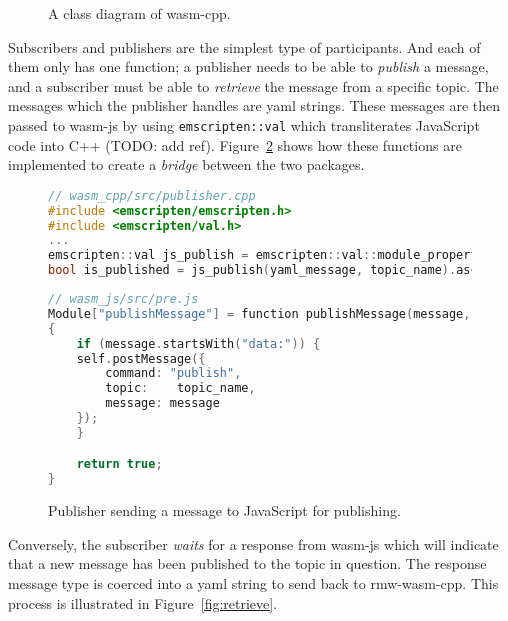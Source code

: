 \begin{figure}[htbp]
            \vspace{1em}
            \caption{A class diagram of \textsf{wasm-cpp}.}
            \label{fig:classes}
        \end{figure}
        

        Subscribers and publishers are the simplest type of participants. And each of them only has one function; a publisher needs to be able to \textit{publish} a message, and a subscriber must be able to \textit{retrieve} the message from a specific topic. The messages which the publisher handles are yaml strings. These messages are then passed to \textsf{wasm-js} by using \texttt{emscripten::val} which transliterates JavaScript code into C++ (TODO: add ref). Figure~\ref{fig:publish} shows how these functions are implemented to create a \textit{bridge} between the two packages.

        \begin{figure}[htbp]
            \centering
            \begin{lstlisting}[language=C++]
// wasm_cpp/src/publisher.cpp
#include <emscripten/emscripten.h>
#include <emscripten/val.h>
...
emscripten::val js_publish = emscripten::val::module_property("publishMessage");
bool is_published = js_publish(yaml_message, topic_name).as<bool>();
\end{lstlisting}

            \begin{lstlisting}[language=C++] 
// wasm_js/src/pre.js
Module["publishMessage"] = function publishMessage(message, topic_name)
{
    if (message.startsWith("data:")) {
    self.postMessage({
        command: "publish",
        topic:    topic_name,
        message: message
    });
    }

    return true;
}
\end{lstlisting}
            \caption{Publisher sending a message to JavaScript for publishing.}
            \label{fig:publish}
        \end{figure}

    Conversely, the subscriber \textit{waits} for a response from \textsf{wasm-js} which will indicate that a new message has been published to the topic in question. The response message type is coerced into a yaml string to send back to \textsf{rmw-wasm-cpp}. This process is illustrated in Figure~\ref{fig:retrieve}.

